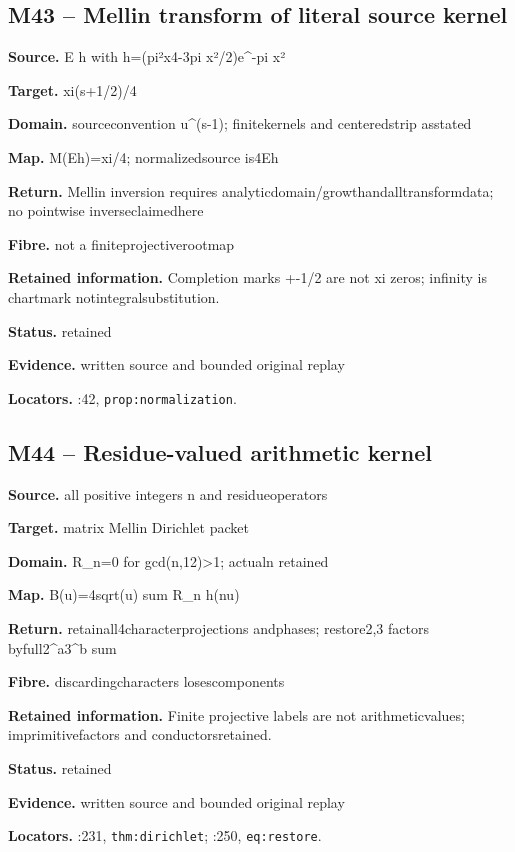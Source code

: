 \subsection*{M43 -- Mellin transform of literal source kernel}
\noindent\textbf{Source.} E h with h=(pi²x4-3pi x²/2)e\textasciicircum{}-pi x²\par
\noindent\textbf{Target.} xi(s+1/2)/4\par
\noindent\textbf{Domain.} sourceconvention u\textasciicircum{}(s-1); finitekernels and centeredstrip asstated\par
\noindent\textbf{Map.} M(Eh)=xi/4; normalizedsource is4Eh\par
\noindent\textbf{Return.} Mellin inversion requires analyticdomain/growthandalltransformdata; no pointwise inverseclaimedhere\par
\noindent\textbf{Fibre.} not a finiteprojectiverootmap\par
\noindent\textbf{Retained information.} Completion marks +-1/2 are not xi zeros; infinity is chartmark notintegralsubstitution.\par
\noindent\textbf{Status.} retained\par
\noindent\textbf{Evidence.} written source and bounded original replay\par
\noindent\textbf{Locators.} :42, \texttt{prop:normalization}.
\subsection*{M44 -- Residue-valued arithmetic kernel}
\noindent\textbf{Source.} all positive integers n and residueoperators\par
\noindent\textbf{Target.} matrix Mellin Dirichlet packet\par
\noindent\textbf{Domain.} R\_n=0 for gcd(n,12)>1; actualn retained\par
\noindent\textbf{Map.} B(u)=4sqrt(u) sum R\_n h(nu)\par
\noindent\textbf{Return.} retainall4characterprojections andphases; restore2,3 factors byfull2\textasciicircum{}a3\textasciicircum{}b sum\par
\noindent\textbf{Fibre.} discardingcharacters losescomponents\par
\noindent\textbf{Retained information.} Finite projective labels are not arithmeticvalues; imprimitivefactors and conductorsretained.\par
\noindent\textbf{Status.} retained\par
\noindent\textbf{Evidence.} written source and bounded original replay\par
\noindent\textbf{Locators.} :231, \texttt{thm:dirichlet}; :250, \texttt{eq:restore}.
